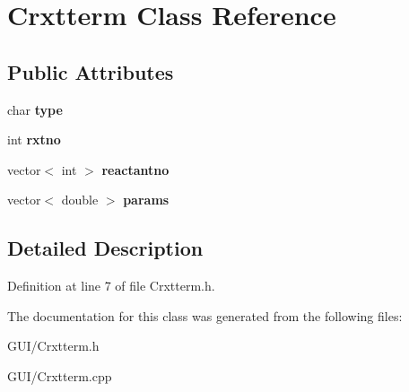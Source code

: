 \hypertarget{class_crxtterm}{}\section{Crxtterm Class Reference}
\label{class_crxtterm}
\subsection*{Public Attributes}
\begin{DoxyCompactItemize}
\item 
\mbox{\label{class_crxtterm_a85feffd7bd02d0418b53f16fdd396ff1}} 
char {\bfseries type}
\item 
\mbox{\label{class_crxtterm_a71179bde972f1b8f0b245fb0fe4304fc}} 
int {\bfseries rxtno}
\item 
\mbox{\label{class_crxtterm_a7c7948f9cb8d7f2404cf00601b823142}} 
vector$<$ int $>$ {\bfseries reactantno}
\item 
\mbox{\label{class_crxtterm_a753a56e039128595a2ba72a9c274b4ad}} 
vector$<$ double $>$ {\bfseries params}
\end{DoxyCompactItemize}


\subsection{Detailed Description}


Definition at line 7 of file Crxtterm.\+h.



The documentation for this class was generated from the following files\+:\begin{DoxyCompactItemize}
\item 
G\+U\+I/Crxtterm.\+h\item 
G\+U\+I/Crxtterm.\+cpp\end{DoxyCompactItemize}
